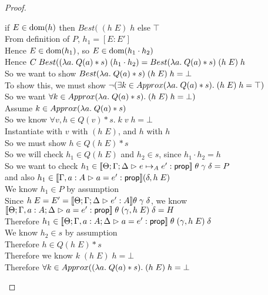 \begin{proof}
\begin{tabbedproof}
    \oooooox if $E \in \domain{h}$ then $Best(\;(h\;E)\;h$ else $\top$ \\
    \oooooo From definition of $P$, $h_1 = [E:E']$ \\
    \oooooo Hence $E \in \domain{h_1}$, so $E \in \domain{h_1 \cdot h_2}$ \\
    \oooooo Hence $C\;Best((\semfun{a}{Q(a)*s})\;(h_1 \cdot h_2) = 
                   Best(\semfun{a}{Q(a)*s})\;(h\;E)\;h$ \\
    \oooooo So we want to show $Best(\semfun{a}{Q(a)*s})\;(h\;E)\;h = \bot$ \\
    \oooooo To show this, we must show $\lnot(\exists k \in Approx(\semfun{a}{Q(a)*s}).\; (h\;E)\;h = \top)$ \\
    \oooooo So we want $\forall k \in Approx(\semfun{a}{Q(a)*s}).\; (h\;E)\;h = \bot)$ \\
    \oooooo Assume $k \in Approx(\semfun{a}{Q(a)*s})$ \\
    \ooooooo So we know $\forall v, h \in Q(v)*s.\; k\;v\;h = \bot$ \\
    \ooooooo Instantiate with $v$ with $(h\;E)$, and $h$ with $h$ \\
    \ooooooo So we must show $h \in Q(h\;E)*s$ \\
    \ooooooo So we will check $h_1 \in Q(h\;E)$ and $h_2 \in s$, since $h_1 \cdot h_2 = h$ \\
    \ooooooo So we want to check $h_1 \in \interp{\judgeA{e \pointsto_A e'}{\assert}}\;\theta\;\gamma\;\delta = P$ \\
    \ooooooox and also $h_1 \in \interp{\judgeA[\Gamma,a:A]{a = e'}{\assert}}(\delta,h\;E)$ \\
    \ooooooo We know $h_1 \in P$ by assumption \\
    \ooooooo Since $h\;E = E' = \interp{\judgeA{e'}{A}}\theta\;\gamma\;\delta$, we know 
              $\interp{\judgeA[\Theta; \Gamma,a:A; \Delta]{a = e'}{\assert}}\;\theta\;(\gamma,h\;E)\;\delta = H$ \\
    \ooooooo Therefore $h_1 \in \interp{\judgeA[\Theta; \Gamma,a:A; \Delta]{a = e'}{\assert}}\;\theta\;(\gamma, h\;E)\;\delta$ \\
    \ooooooo We know $h_2 \in s$ by assumption\\
    \ooooooo Therefore $h \in Q(h\;E)*s$ \\
    \ooooooo Therefore we know $k\;(h\;E)\;h = \bot$ \\
    \oooooo Therefore $\forall k \in Approx((\semfun{a}{Q(a)*s}).\; (h\;E)\;h = \bot$ \\

\end{tabbedproof}
\end{proof}
